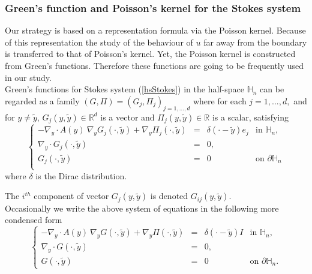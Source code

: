 \documentclass[11pt, reqno]{amsart}
\theoremstyle{definition}
\theoremstyle{remark}
\numberwithin{equation}{section}
\begin{document}
	
	

	
	\subsubsection{Green's function and Poisson's kernel for the Stokes system}
	
	\noindent 	Our strategy is based on a representation formula via the Poisson kernel. 
Because of this representation the study of the behaviour of $u$ far away from the boundary  is transferred to that of Poisson's kernel. Yet, the Poisson kernel is constructed from Green's functions. Therefore these functions are going to be frequently used in our study.\\
	
	\noindent  Green's functions for Stokes system (\ref{hsStokes}) in the half-space ${\mathbb{H}}_n$ can be regarded as a family $(G,\Pi)=(G_j,\Pi_j)_{j=1,...,d}$ where for each $j=1,...,d,$ and for $y\neq \tilde{y}$, $G_j(y,\tilde{y})\in\mathbb{R}^d $ is a vector and $\Pi_j(y,\tilde{y})\in\mathbb{R}$ is a scalar, satisfying 
	\begin{equation*}
		\left\{
		\begin{array}{rcll}
			-\nabla_y\cdot A(y) \: \nabla_y G_j(\cdot ,\tilde{y}) +  \nabla_y \Pi_j(\cdot ,\tilde{y})&=& \delta(\cdot -\tilde{y}) e_j   &\mbox{in }{\mathbb{H}}_n ,\\
			\nabla_y\cdot G_j(\cdot,\tilde{y})&=& 0 , &\\
			G_j(\cdot,\tilde{y}) &=& 0   & \mbox{on } \partial{\mathbb{H}}_n\\
		\end{array}
		\right. 
	\end{equation*}  	
	where $\delta$ is the Dirac distribution.
	
	
	\noindent 	The $i^{th}$ component of vector $G_j(y,\tilde{y})$ is denoted 	 $G_{ij}(y,\tilde{y})$.\\
	
	
	
	\noindent Occasionally we write the above system of equations in the following more condensed form
	\begin{equation}\label{G}
		\left\{
		\begin{array}{rcll}
			-\nabla_y\cdot A(y) \: \nabla_y G(\cdot, \tilde{y}) +  \nabla_y \Pi(\cdot,\tilde{y})&=& \delta(\cdot - \tilde{y}) I & \mbox{in } {\mathbb{H}}_n,\\
			\nabla_y\cdot G(\cdot,\tilde{y})&=& 0,    &\\
			G(\cdot ,\tilde{y}) &=& 0  \quad & \mbox{on } \partial{\mathbb{H}}_n.
		\end{array}
		\right. 
	\end{equation}
	
\end{document}
